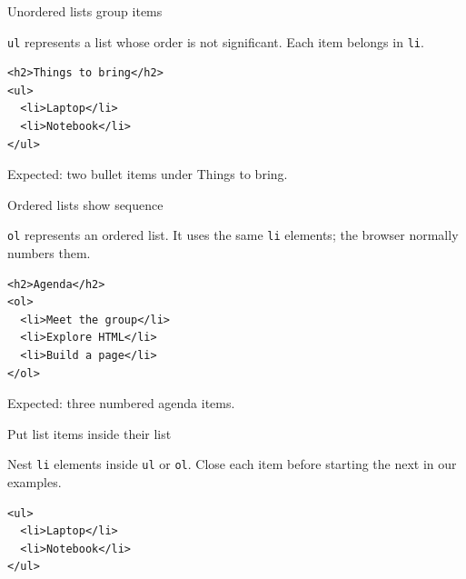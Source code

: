 \documentclass[aspectratio=169,12pt]{beamer}
\begin{document}
\begin{frame}[fragile]{Unordered lists group items}
\begin{conceptblock}
\texttt{ul} represents a list whose order is not significant. Each item belongs in \texttt{li}.
\end{conceptblock}
\begin{lstlisting}
<h2>Things to bring</h2>
<ul>
  <li>Laptop</li>
  <li>Notebook</li>
</ul>
\end{lstlisting}

\small Expected: two bullet items under Things to bring.
\end{frame}

\begin{frame}[fragile]{Ordered lists show sequence}
\begin{conceptblock}
\texttt{ol} represents an ordered list. It uses the same \texttt{li} elements; the browser normally numbers them.
\end{conceptblock}
\begin{lstlisting}
<h2>Agenda</h2>
<ol>
  <li>Meet the group</li>
  <li>Explore HTML</li>
  <li>Build a page</li>
</ol>
\end{lstlisting}

\small Expected: three numbered agenda items.
\end{frame}

\begin{frame}[fragile]{Put list items inside their list}
\begin{commonmistake}
Nest \texttt{li} elements inside \texttt{ul} or \texttt{ol}. Close each item before starting the next in our examples.
\end{commonmistake}
\begin{lstlisting}
<ul>
  <li>Laptop</li>
  <li>Notebook</li>
</ul>
\end{lstlisting}

\end{frame}
\end{document}
